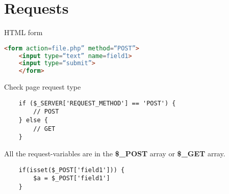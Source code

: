 \documentclass{article}
\begin{document}
\section{Requests}

HTML form

\begin{lstlisting}[language=HTML]
    <form action=file.php” method=“POST”>
    <input type=“text” name=field1>
    <input type=“submit”>
    </form>
\end{lstlisting}

Check page request type

\begin{lstlisting}
    if ($_SERVER['REQUEST_METHOD'] == 'POST') {
        // POST
    } else {
        // GET
    }
\end{lstlisting}

All the request-variables are in the \textbf{\$\_POST} array or  \textbf{\$\_GET} array.

\begin{lstlisting}
    if(isset($_POST['field1'])) {
        $a = $_POST['field1']
    }
\end{lstlisting}
\end{document}
